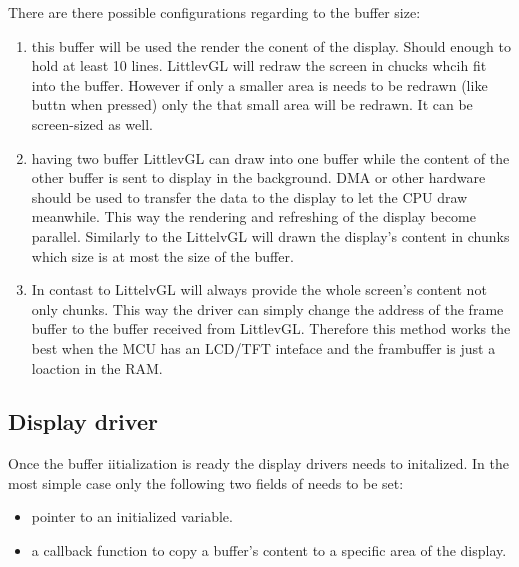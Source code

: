 \documentclass[letterpaper,10pt,english]{sphinxmanual}
\begin{document}
There are there possible configurations regarding to the buffer size:
\begin{enumerate}
\item {} 
 this buffer will be used the render the conent of the display. Should enough to hold at least 10 lines.
LittlevGL will redraw the screen in chucks whcih fit into the buffer. However if only a smaller area is needs to be redrawn (like buttn when pressed) only the that small area will be redrawn.
It can be screen-sized as well.

\item {} 
 having two buffer LittlevGL can draw into one buffer while the content of the other buffer is sent to display in the background.
DMA or other hardware should be used to transfer the data to the display to let the CPU draw meanwhile.
This way the rendering and refreshing of the display become parallel. Similarly to the  LittelvGL will drawn the display’s content in chunks which size is at most the size of the buffer.

\item {} 
In contast to  LittelvGL will always provide the whole screen’s content not only chunks. This way the driver can simply change the address of the frame buffer to the buffer received from LittlevGL.
Therefore this method works the best when the MCU has an LCD/TFT inteface and the frambuffer is just a loaction in the RAM.

\end{enumerate}


\subsection{Display driver}
\label{\detokenize{porting/display:display-driver}}
Once the buffer iitialization is ready the display drivers needs to initalized. In the most simple case only the following two fields of  needs to be set:
\begin{itemize}
\item {} 
 pointer to an initialized  variable.

\item {} 
 a callback function to copy a buffer’s content to a specific area of the display.

\end{itemize}
\end{document}
